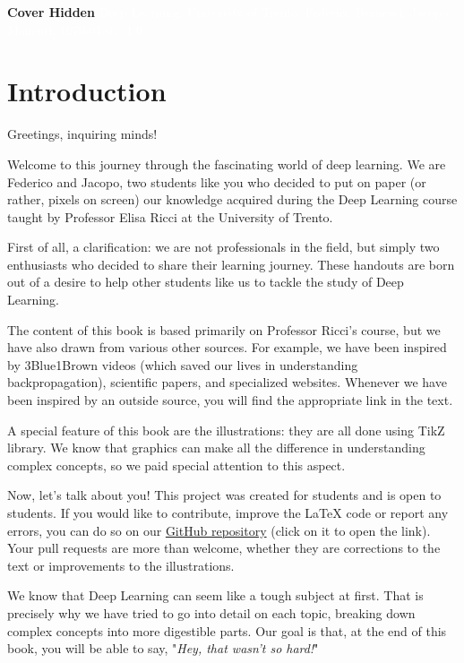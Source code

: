 \documentclass[11pt,fleqn,oneside]{book} %
\newcommand{\AUTHOR}{Federico Brancasi, Jacopo Manenti}
\newcommand{\DATE}{\today}
\newcommand{\VERSION}{1.0}
\newcommand{\TITLE}{Deep Learning}
\newcommand{\SUBTITLE}{University of Trento}
\renewcommand{\coverpage}[5]{{\Huge\textbf{Cover Hidden}}
    \textcolor{white}{#1, #2, #3, #4, #5}}
\begin{document}

\coverpage{\TITLE}{\SUBTITLE}{\AUTHOR}{\DATE}{\VERSION}

\newpage
\chapter*{Introduction}
Greetings, inquiring minds!

Welcome to this journey through the fascinating world of deep learning. We are Federico and Jacopo, two students like you who decided to put on paper (or rather, pixels on screen) our knowledge acquired during the Deep Learning course taught by Professor Elisa Ricci at the University of Trento.

First of all, a clarification: we are not professionals in the field, but simply two enthusiasts who decided to share their learning journey. These handouts are born out of a desire to help other students like us to tackle the study of Deep Learning.

The content of this book is based primarily on Professor Ricci's course, but we have also drawn from various other sources. For example, we have been inspired by 3Blue1Brown videos (which saved our lives in understanding backpropagation), scientific papers, and specialized websites. Whenever we have been inspired by an outside source, you will find the appropriate link in the text.

A special feature of this book are the illustrations: they are all done using TikZ library. We know that graphics can make all the difference in understanding complex concepts, so we paid special attention to this aspect.

Now, let's talk about you! This project was created for students and is open to students. If you would like to contribute, improve the LaTeX code or report any errors, you can do so on our \href{https://github.com/federicobrancasi/Deep-Learning}{GitHub repository} (click on it to open the link). Your pull requests are more than welcome, whether they are corrections to the text or improvements to the illustrations.

We know that Deep Learning can seem like a tough subject at first. That is precisely why we have tried to go into detail on each topic, breaking down complex concepts into more digestible parts. Our goal is that, at the end of this book, you will be able to say, "\textit{Hey, that wasn't so hard!}"
\end{document}
